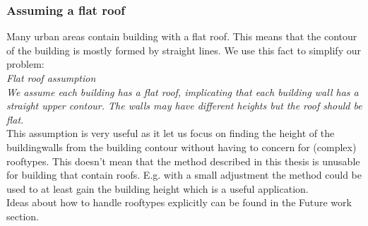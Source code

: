 \documentclass[10pt]{article}
\begin{document}
\subsubsection{Assuming a flat roof}
	Many urban areas contain building with a flat roof. This means that the
	contour of the building is mostly formed by straight lines.  We use this
	fact to simplify our problem:\\
	\emph{Flat roof assumption}\\
	\emph{We assume each building has a flat roof, implicating that each building wall
	has a straight upper contour. The walls may have different heights but the roof should be flat.}\\

	This assumption is very useful as it let us focus on finding the height
	of the buildingwalls from the building contour without having to concern
	for (complex) rooftypes.  This doesn't mean that the method described in
		this thesis is unusable for building that contain roofs. E.g.
		with a small adjustment the method could be used to at least
		gain the building height which is a useful application.\\
	Ideas about how to handle rooftypes explicitly can be found in the
	Future work section.\\
\end{document}
